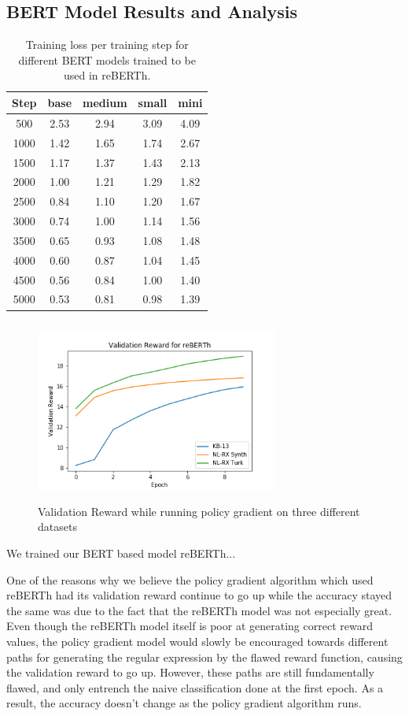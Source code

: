 \documentclass[11pt,a4paper]{article}
\begin{document}
\subsection*{BERT Model Results and Analysis}


\begin{table}
\centering
\begin{tabular}{|c|c|c|c|c|}
\hline
\textbf{Step} & \textbf{base} & \textbf{medium} & \textbf{small} & \textbf{mini} \\
\hline
500 & 2.53  & 2.94 & 3.09 & 4.09 \\
1000 & 1.42  & 1.65 & 1.74 & 2.67 \\
1500 & 1.17  & 1.37 & 1.43 & 2.13 \\
2000 & 1.00  & 1.21 & 1.29 & 1.82 \\
2500 & 0.84 & 1.10 & 1.20 & 1.67 \\
3000 & 0.74  & 1.00 & 1.14 & 1.56 \\
3500 & 0.65  & 0.93 & 1.08 & 1.48 \\
4000 & 0.60  & 0.87 & 1.04 & 1.45 \\
4500 & 0.56  & 0.84 & 1.00 & 1.40 \\
5000 & 0.53  & 0.81 & 0.98 & 1.39 \\\hline
\end{tabular}
\caption{Training loss per training step for different BERT models trained to be used in reBERTh.}\label{tab:accents}
\end{table}

\begin{figure}
\includegraphics[width=8cm, height=6cm]{pic.png}
\caption{Validation Reward while running policy gradient on three different datasets}\label{tab:accents}
\end{figure}

We trained our BERT based model reBERTh... %

One of the reasons why we believe the policy gradient algorithm which used reBERTh had its validation reward continue to go up while the accuracy stayed the same was due to the fact that the reBERTh model was not especially great. Even though the reBERTh model itself is poor at generating correct reward values, the policy gradient model would slowly be encouraged towards different paths for generating the regular expression by the flawed reward function, causing the validation reward to go up. However, these paths are still fundamentally flawed, and only entrench the naive classification done at the first epoch. As a result, the accuracy doesn't change as the policy gradient algorithm runs.
\end{document}
